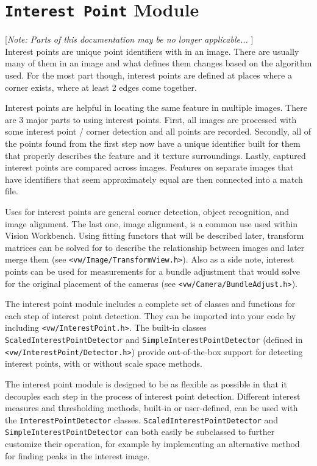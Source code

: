 \chapter{{\tt Interest Point} Module}\label{ch:interestpoint-module}

[{\em Note: Parts of this documentation may be no longer applicable... }]
$$
$$
Interest points are unique point identifiers with in an image. There
are usually many of them in an image and what defines them changes
based on the algorithm used. For the most part though, interest points
are defined at places where a corner exists, where at least 2 edges
come together.

Interest points are helpful in locating the same feature in multiple
images. There are 3 major parts to using interest points. First, all
images are processed with some interest point / corner detection and
all points are recorded. Secondly, all of the points found from the
first step now have a unique identifier built for them that properly
describes the feature and it texture surroundings. Lastly, captured
interest points are compared across images. Features on separate
images that have identifiers that seem approximately equal are then
connected into a match file.

Uses for interest points are general corner detection, object
recognition, and image alignment. The last one, image alignment, is a
common use used within Vision Workbench. Using fitting functors that
will be described later, transform matrices can be solved for to
describe the relationship between images and later merge them (see
{\tt <vw/Image/TransformView.h>}). Also as a side note, interest points
can be used for measurements for a bundle adjustment that would solve
for the original placement of the cameras (see
{\tt <vw/Camera/BundleAdjust.h>}).

The interest point module includes a complete set of classes and
functions for each step of interest point detection. They can be
imported into your code by including {\tt <vw/InterestPoint.h>}. The
built-in classes {\tt ScaledInterestPointDetector} and
{\tt SimpleInterestPointDetector} (defined in {\tt
  <vw/InterestPoint/Detector.h>}) provide out-of-the-box support for
detecting interest points, with or without scale space methods.

The interest point module is designed to be as flexible as possible in
that it decouples each step in the process of interest point
detection. Different interest measures and thresholding methods,
built-in or user-defined, can be used with the 
{\tt InterestPointDetector} classes. {\tt ScaledInterestPointDetector}
and {\tt SimpleInterestPointDetector} can both easily be subclassed to
further customize their operation, for example by implementing an
alternative method for finding peaks in the interest image.

